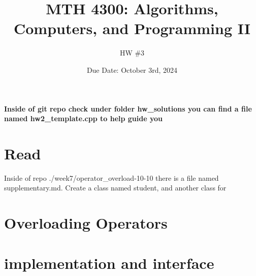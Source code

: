 \documentclass[a4paper]{article}
\title{MTH 4300: Algorithms, Computers, and Programming II}
\author{HW \#3}
\date{Due Date: October 3rd, 2024}
\begin{document}
\maketitle

\textbf{Inside of git repo check under folder hw\_solutions you can find a file named hw2\_template.cpp to help guide you}

\section{Read}
Inside of repo ./week7/operator_overload-10-10 there is a file named supplementary.md. Create 
a class named student, and another class for 


\section{Overloading Operators}



\section{implementation and interface}
\end{document}
